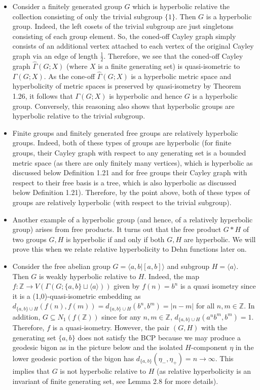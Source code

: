 \documentclass[12pt]{article}
\begin{document}
	\begin{itemize}
		\item Consider a finitely generated group $G$ which is hyperbolic relative the collection consisting of only the trivial subgroup $\{1\}$. Then $G$ is a hyperbolic group. Indeed, the left cosets of the trivial subgroup are just singletons consisting of each group element. So, the coned-off Cayley graph simply consists of an additional vertex attached to each vertex of the original Cayley graph via an edge of length $\frac{1}{2}$. Therefore, we see that the coned-off Cayley graph $\hat{\Gamma}(G; X)$ (where $X$ is a finite generating set) is quasi-isometric to $\Gamma(G;X)$. As the cone-off $\hat{\Gamma}(G; X)$ is a hyperbolic metric space and hyperbolicity of metric spaces is preserved by quasi-isometry by Theorem 1.26, it follows that $\Gamma(G;X)$ is hyperbolic and hence $G$ is a hyperbolic group. Conversely, this reasoning also shows that hyperbolic groups are hyperbolic relative to the trivial subgroup. 
		\item Finite groups and finitely generated free groups are relatively hyperbolic groups. Indeed, both of these types of groups are hyperbolic (for finite groups, their Cayley graph with respect to any generating set is a bounded metric space (as there are only finitely many vertices), which is hyperbolic as discussed below Definition 1.21 and for free groups their Cayley graph with respect to their free basis is a tree, which is also hyperbolic as discussed below Definition 1.21). Therefore, by the point above, both of these types of groups are relatively hyperbolic (with respect to the trivial subgroup). 
		\item Another example of a hyperbolic group (and hence, of a relatively hyperbolic group) arises from free products. It turns out that the free product $G * H$ of two groups $G,H$ is hyperbolic if and only if both $G, H$ are hyperbolic. We will prove this when we relate relative hyperbolicity to Dehn functions later on. 
		\item Consider the free abelian group $G = \langle a,b \vert [a,b] \rangle$ and subgroup $H = \langle a \rangle$. Then $G$ is weakly hyperbolic relative to $H$. Indeed, the map $f: \mathbb{Z} \rightarrow V(\Gamma(G; \{a,b\} \sqcup \langle a \rangle))$ given by $f(n) = b^n$ is a quasi isometry since it is a (1,0)-quasi-isometric embedding as $d_{\{a,b\} \cup H} (f(n),f(m)) = d_{\{a,b\} \cup H} (b^n,b^m) = \vert n - m \vert$ for all $n,m \in \mathbb{Z}$. In addition, $G \subseteq N_1(f(\mathbb{Z}))$ since for any $n,m \in \mathbb{Z}$, $d_{\{a,b\} \cup H}(a^nb^m, b^m) = 1$. Therefore, $f$ is a quasi-isometry. However, the pair $(G,H)$ with the generating set $\{a,b\}$ does not satisfy the BCP because we may produce a geodesic bigon as in the picture below and the isolated $H$-component $\eta$ in the lower geodesic portion of the bigon has $d_{\{a,b\}} (\eta_{-}, \eta_{+}) = n \rightarrow \infty$. This implies that $G$ is not hyperbolic relative to $H$ (as relative hyperbolicity is an invariant of finite generating set, see Lemma 2.8 for more details). 

\end{itemize}
\end{document}
